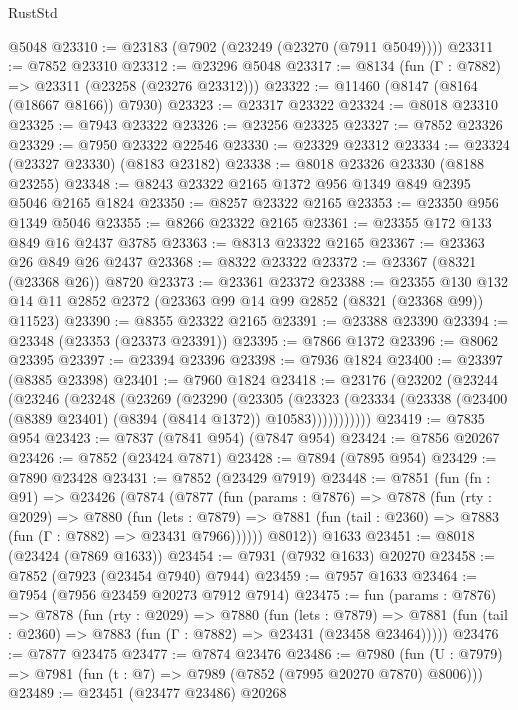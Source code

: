 \begin{lexlean}{RustStd}
\begin{coremodule}
    @5048
@23310 := @23183 (@7902 (@23249 (@23270 (@7911 @5049))))
@23311 := @7852 @23310
@23312 := @23296 @5048
@23317 := @8134 (fun (Γ : @7882) => @23311 (@23258 (@23276 @23312)))
@23322 := @11460 (@8147 (@8164 (@18667 @8166)) @7930)
@23323 := @23317 @23322
@23324 := @8018 @23310
@23325 := @7943 @23322
@23326 := @23256 @23325
@23327 := @7852 @23326
@23329 := @7950 @23322 @22546
@23330 := @23329 @23312
@23334 := @23324 (@23327 @23330) (@8183 @23182)
@23338 := @8018 @23326 @23330 (@8188 @23255)
@23348 := @8243 @23322 @2165 @1372 @956 @1349 @849 @2395 @5046 @2165 @1824
@23350 := @8257 @23322 @2165
@23353 := @23350 @956 @1349 @5046
@23355 := @8266 @23322 @2165
@23361 := @23355 @172 @133 @849 @16 @2437 @3785
@23363 := @8313 @23322 @2165
@23367 := @23363 @26 @849 @26 @2437
@23368 := @8322 @23322
@23372 := @23367 (@8321 (@23368 @26)) @8720
@23373 := @23361 @23372
@23388 := @23355
    @130
    @132
    @14
    @11
    @2852
    @2372
    (@23363 @99 @14 @99 @2852 (@8321 (@23368 @99)) @11523)
@23390 := @8355 @23322 @2165
@23391 := @23388 @23390
@23394 := @23348 (@23353 (@23373 @23391))
@23395 := @7866 @1372
@23396 := @8062 @23395
@23397 := @23394 @23396
@23398 := @7936 @1824
@23400 := @23397 (@8385 @23398)
@23401 := @7960 @1824
@23418 := @23176
    (@23202
      (@23244
        (@23246
          (@23248
            (@23269
              (@23290
                (@23305
                  (@23323
                    (@23334 (@23338 (@23400 (@8389 @23401) (@8394 (@8414 @1372)) @10583)))))))))))
@23419 := @7835 @954
@23423 := @7837 (@7841 @954) (@7847 @954)
@23424 := @7856 @20267
@23426 := @7852 (@23424 @7871)
@23428 := @7894 (@7895 @954)
@23429 := @7890 @23428
@23431 := @7852 (@23429 @7919)
@23448 := @7851
    (fun (fn : @91) =>
    @23426
      (@7874
        (@7877
          (fun (params : @7876) =>
          @7878
            (fun (rty : @2029) =>
            @7880
              (fun (lets : @7879) =>
              @7881 (fun (tail : @2360) => @7883 (fun (Γ : @7882) => @23431 @7966))))))
        @8012))
    @1633
@23451 := @8018 (@23424 (@7869 @1633))
@23454 := @7931 (@7932 @1633) @20270
@23458 := @7852 (@7923 (@23454 @7940) @7944)
@23459 := @7957 @1633
@23464 := @7954 (@7956 @23459 @20273 @7912 @7914)
@23475 := fun (params : @7876) =>
  @7878
    (fun (rty : @2029) =>
    @7880
      (fun (lets : @7879) =>
      @7881 (fun (tail : @2360) => @7883 (fun (Γ : @7882) => @23431 (@23458 @23464)))))
@23476 := @7877 @23475
@23477 := @7874 @23476
@23486 := @7980
    (fun (U : @7979) => @7981 (fun (t : @7) => @7989 (@7852 (@7995 @20270 @7870) @8006)))
@23489 := @23451 (@23477 @23486) @20268

\end{coremodule}
\end{lexlean}
